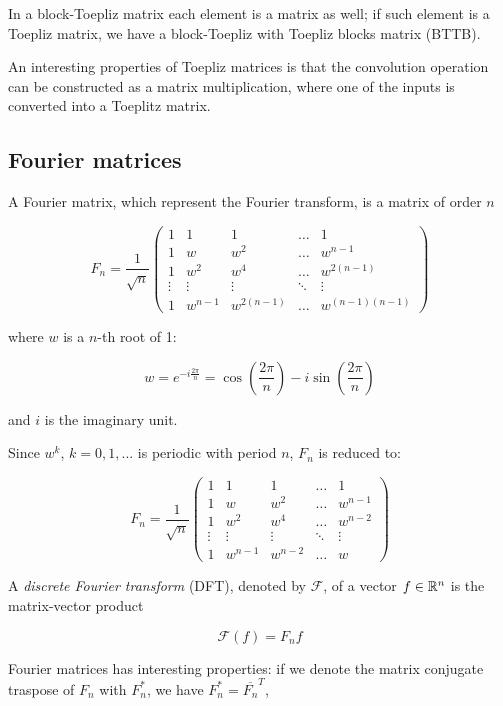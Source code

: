 In a block-Toepliz matrix each element is a matrix as well; if such element is a Toepliz matrix, we have a block-Toepliz with Toepliz blocks matrix (BTTB).

An interesting properties of Toepliz matrices is that the convolution operation can be constructed as a matrix multiplication, where one of the inputs is converted into a Toeplitz matrix.

\subsection{Fourier matrices}

A Fourier matrix, which represent the Fourier transform, is a matrix of order $n$

$$F_n = \dfrac{1}{\sqrt{n}}\begin{pmatrix}
1 & 1 & 1 & \dots & 1 \\
1 & w & w^2 & \dots & w^{n-1} \\
1 & w^2 & w^4 & \dots & w^{2(n-1)} \\
\vdots & \vdots & \vdots & \ddots & \vdots \\
1 & w^{n-1} & w^{2(n-1)} & \dots & w^{(n-1)(n-1)}
\end{pmatrix}$$

where $w$ is a $n$-th root of 1:

$$ w= e^{-i \frac{2\pi}{n}} = \cos \left(\dfrac{2\pi}{n} \right) - i \sin \left( \dfrac{2\pi}{n} \right)$$

and $i$ is the imaginary unit.

Since $w^k$, $k=0,1,...$ is periodic with period $n$, $F_n$ is reduced to:

$$F_n = \dfrac{1}{\sqrt{n}}\begin{pmatrix}
1 & 1 & 1 & \dots & 1 \\
1 & w & w^2 & \dots & w^{n-1} \\
1 & w^2 & w^4 & \dots & w^{n-2} \\
\vdots & \vdots & \vdots & \ddots & \vdots \\
1 & w^{n-1} & w^{n-2} & \dots & w
\end{pmatrix}$$


A \emph{discrete Fourier transform} (DFT), denoted by $\mathcal{F}$, of a vector $f \in \mathbb{R}^n$ is the matrix-vector product

$$\mathcal{F}(f) = F_n f$$

Fourier matrices has interesting properties: if we denote the matrix conjugate traspose of $F_n$ with $F_n^*$, we have $F_n^* = \overline{F_n}^T$,

